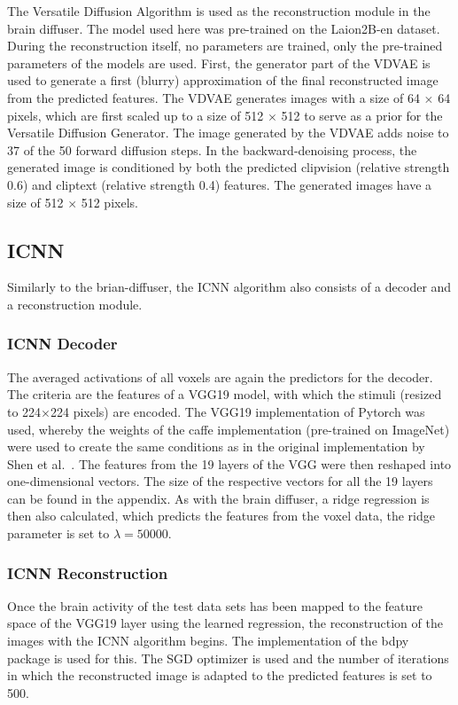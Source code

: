 The Versatile Diffusion Algorithm\cite{xuVersatileDiffusionText2024} is used as the reconstruction module in the brain diffuser. The model used here was pre-trained on the Laion2B-en\cite{schuhmannLAION400MOpenDataset2021} dataset. During the reconstruction itself, no parameters are trained, only the pre-trained parameters of the models are used. First, the generator part of the VDVAE is used to generate a first (blurry) approximation of the final reconstructed image from the predicted features. The VDVAE generates images with a size of 64 $\times$ 64 pixels, which are first scaled up to a size of 512 $\times$ 512 to serve as a prior for the Versatile Diffusion Generator. The image generated by the VDVAE adds noise to 37 of the 50 forward diffusion steps. In the backward-denoising process, the generated image is conditioned by both the predicted clipvision (relative strength 0.6) and cliptext (relative strength 0.4) features. The generated images have a size of 512 $\times$ 512 pixels. 

\subsection{ICNN}
Similarly to the brian-diffuser, the ICNN\cite{shenDeepImageReconstruction2019} algorithm also consists of a decoder and a reconstruction module. 
\subsubsection{ICNN Decoder}
The averaged activations of all voxels are again the predictors for the decoder. The criteria are the features of a VGG19\cite{simonyanVeryDeepConvolutional2014} model, with which the stimuli (resized to 224$\times$224 pixels) are encoded. The VGG19 implementation of Pytorch was used, whereby the weights of the caffe implementation\cite{ModelZoo} (pre-trained on ImageNet) were used to create the same conditions as in the original implementation by Shen et al.\ \cite{shenDeepImageReconstruction2019}. The features from the 19 layers of the VGG were then reshaped into one-dimensional vectors. The size of the respective vectors for all the 19 layers can be found in the appendix. As with the brain diffuser, a ridge regression is then also calculated, which predicts the features from the voxel data, the ridge parameter is set to $\lambda=50000$.

\subsubsection{ICNN Reconstruction}
Once the brain activity of the test data sets has been mapped to the feature space of the VGG19 layer using the learned regression, the reconstruction of the images with the ICNN algorithm\cite{shenDeepImageReconstruction2019} begins. The implementation of the bdpy package\cite{KamitaniLabBdpy2024} is used for this. The SGD optimizer is used and the number of iterations in which the reconstructed image is adapted to the predicted features is set to 500. 

